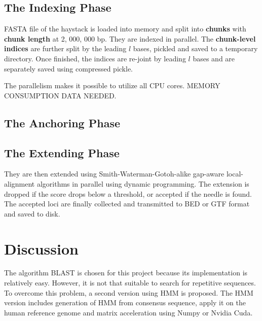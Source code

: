 \documentclass[10pt,final,journal,twocolumn,a4paper]{IEEEtran}
\begin{document}
\subsection{The Indexing Phase}

FASTA file of the haystack is loaded into memory and split into \textbf{chunks} with \textbf{chunk length} at 2, 000, 000 bp. They are indexed in parallel. The \textbf{chunk-level indices} are further split by the leading $l$ bases, pickled and saved to a temporary directory. Once finished, the indices are re-joint by leading $l$ bases and are separately saved using compressed pickle.

The parallelism makes it possible to utilize all CPU cores. MEMORY CONSUMPTION DATA NEEDED.

\subsection{The Anchoring Phase}

\subsection{The Extending Phase}

They are then extended using Smith-Waterman-Gotoh-alike gap-aware local-alignment algorithms in parallel using dynamic programming. The extension is dropped if the score drops below a threshold, or accepted if the needle is found. The accepted loci are finally collected and transmitted to BED or GTF format and saved to disk.







\section{Discussion}

The algorithm BLAST is chosen for this project because its implementation is relatively easy. However, it is not that suitable to search for repetitive sequences. To overcome this problem, a second version using HMM is proposed. The HMM version includes generation of HMM from consensus sequence, apply it on the human reference genome and matrix acceleration using Numpy or Nvidia Cuda.
\end{document}
